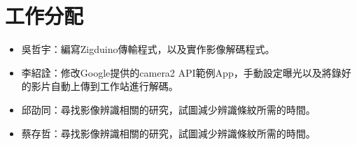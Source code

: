 \documentclass[10pt,a4paper]{article}
\begin{document}
\section*{工作分配}
\begin{itemize}[leftmargin=!,itemindent=-4em]
    \item 吳哲宇：編寫Zigduino傳輸程式，以及實作影像解碼程式。
    \item 李紹詮：修改Google提供的camera2 API範例App，手動設定曝光以及將錄好的影片自動上傳到工作站進行解碼。
    \item 邱劭同：尋找影像辨識相關的研究，試圖減少辨識條紋所需的時間。
    \item 蔡存哲：尋找影像辨識相關的研究，試圖減少辨識條紋所需的時間。
\end{itemize}
\end{document}
